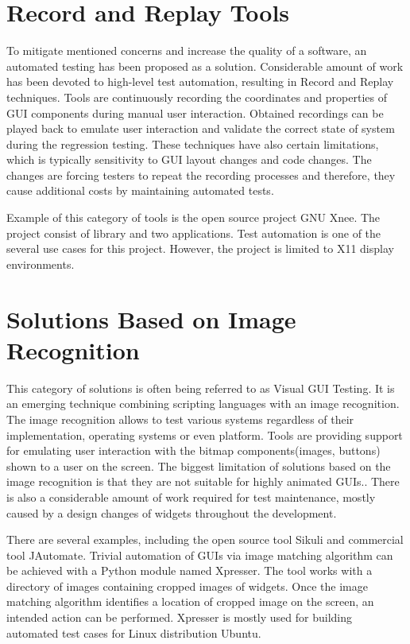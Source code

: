 \section{Record and Replay Tools}
To mitigate mentioned concerns and increase the quality of a software, an automated testing has been proposed as a solution. Considerable amount of work has been devoted to high-level test automation, resulting in Record and Replay techniques. Tools are  continuously recording the coordinates and properties of GUI components during manual user interaction. Obtained recordings can be played back to emulate user interaction and validate the correct state of system during the regression testing. These techniques have also certain limitations, which is typically sensitivity to GUI layout changes and code changes. The changes are forcing testers to repeat the recording processes and therefore, they cause additional costs by maintaining automated tests. \cite{guitesting}

Example of this category of tools is the open source project GNU Xnee. The project consist of library and two applications. Test automation is one of the several use cases for this project. However, the project is limited to X11 display environments.\cite{xnee}

\section{Solutions Based on Image Recognition}
This category of solutions is often being referred to as Visual GUI Testing. It is an emerging technique combining scripting languages with an image recognition. The image recognition allows to test various systems regardless of their implementation, operating systems or even platform. Tools are providing support for emulating user interaction with the bitmap components(images, buttons) shown to a user on the screen. The biggest limitation of solutions based on the image recognition is that they are not suitable for highly animated GUIs.\cite{guitesting}. There is also a considerable amount of work required for test maintenance, mostly caused by a design changes of widgets throughout the development.   

There are several examples, including the open source tool Sikuli and commercial tool JAutomate. Trivial automation of GUIs via image matching algorithm can be achieved with a Python module named Xpresser. The tool works with a directory of images containing cropped images of widgets. Once the image matching algorithm identifies a location of cropped image on the screen, an intended action can be performed.\cite{xpresser} Xpresser is mostly used for building automated test cases for Linux distribution Ubuntu.

